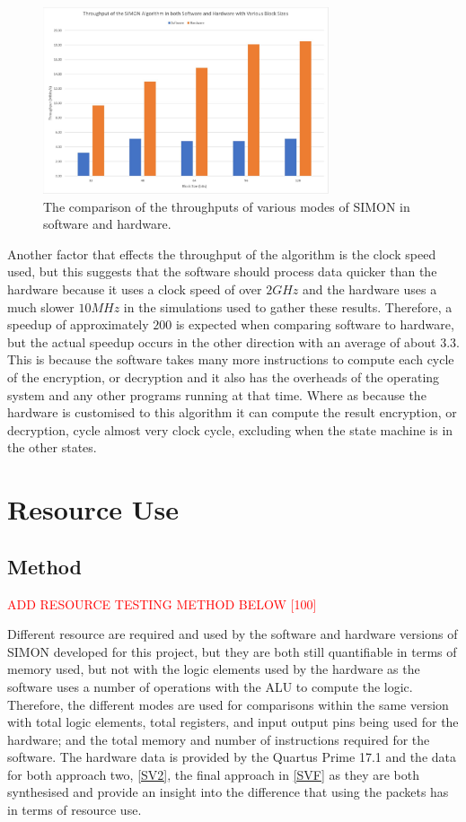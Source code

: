 \documentclass[12pt,twoside,a4paper]{report}
\begin{document}
	\begin{figure}[H]
		\includegraphics[width=0.75\textwidth]{SIMON_throughput}
		\centering
		\caption{The comparison of the throughputs of various modes of SIMON in software and hardware.}
		\label{fig:throughput}
	\end{figure}
	
	Another factor that effects the throughput of the algorithm is the clock speed used, but this suggests that the software should process data quicker than the hardware because it uses a clock speed of over $2GHz$ and the hardware uses a much slower $10MHz$ in the simulations used to gather these results. Therefore, a speedup of approximately $200$ is expected when comparing software to hardware, but the actual speedup occurs in the other direction with an average of about $3.3$. This is because the software takes many more instructions to compute each cycle of the encryption, or decryption and it also has the overheads of the operating system and any other programs running at that time. Where as because the hardware is customised to this algorithm it can compute the result encryption, or decryption, cycle almost very clock cycle, excluding when the state machine is in the other states.

	\section{Resource Use}
	
	\subsection{Method}
	\textcolor{red}{ADD RESOURCE TESTING METHOD BELOW [100]}
	
	Different resource are required and used by the software and hardware versions of SIMON developed for this project, but they are both still quantifiable in terms of memory used, but not with the logic elements used by the hardware as the software uses a number of operations with the ALU to compute the logic. Therefore, the different modes are used for comparisons within the same version with total logic elements, total registers, and input output pins being used for the hardware; and the total memory and number of instructions required for the software. The hardware data is provided by the Quartus Prime 17.1 and the data for both approach two, \autoref{SV2}, the final approach in \autoref{SVF} as they are both synthesised and provide an insight into the difference that using the packets has in terms of resource use.
	
\end{document}
